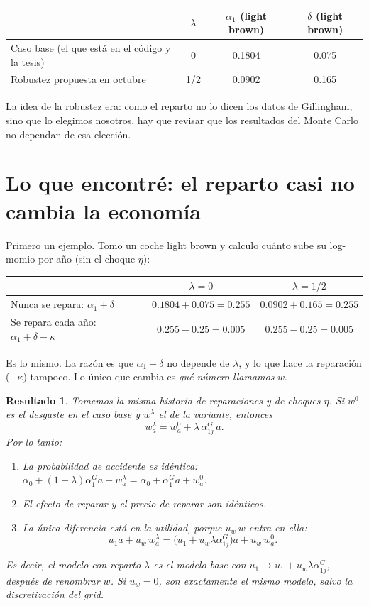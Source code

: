 \documentclass[11pt]{article}
\newtheorem*{resultado}{Resultado}
\begin{document}
\begin{center}
\begin{tabular}{lccc}
\toprule
 & $\lambda$ & $\alpha_1$ (light brown) & $\delta$ (light brown)\\
\midrule
Caso base (el que está en el código y la tesis) & 0 & 0.1804 & 0.075\\
Robustez propuesta en octubre & 1/2 & 0.0902 & 0.165\\
\bottomrule
\end{tabular}
\end{center}

La idea de la robustez era: como el reparto no lo dicen los datos de Gillingham, sino que lo
elegimos nosotros, hay que revisar que los resultados del Monte Carlo no dependan de esa
elección.

\section{Lo que encontré: el reparto casi no cambia la economía}

Primero un ejemplo. Tomo un coche light brown y calculo cuánto sube su log-momio por año
(sin el choque $\eta$):

\begin{center}
\begin{tabular}{lcc}
\toprule
 & $\lambda=0$ & $\lambda=1/2$\\
\midrule
Nunca se repara: $\alpha_1+\delta$ & $0.1804+0.075=0.255$ & $0.0902+0.165=0.255$\\
Se repara cada año: $\alpha_1+\delta-\kappa$ & $0.255-0.25=0.005$ & $0.255-0.25=0.005$\\
\bottomrule
\end{tabular}
\end{center}

Es lo mismo. La razón es que $\alpha_1+\delta$ no depende de $\lambda$, y lo que hace la
reparación ($-\kappa$) tampoco. Lo único que cambia es \emph{qué número llamamos} $w$.

\begin{resultado}
Tomemos la misma historia de reparaciones y de choques $\eta$. Si $w^0$ es el desgaste en el
caso base y $w^\lambda$ el de la variante, entonces
\[
w^\lambda_a=w^0_a+\lambda\,\alpha^G_{1j}\,a .
\]
Por lo tanto:
\begin{enumerate}
  \item La probabilidad de accidente es idéntica:
  $\alpha_0+(1-\lambda)\alpha^G_1a+w^\lambda_a=\alpha_0+\alpha^G_1a+w^0_a$.
  \item El efecto de reparar y el precio de reparar son idénticos.
  \item La única diferencia está en la utilidad, porque $u_w\,w$ entra en ella:
  \[
  u_1a+u_w\,w^\lambda_a=\big(u_1+u_w\lambda\alpha^G_{1j}\big)a+u_w\,w^0_a .
  \]
\end{enumerate}
Es decir, el modelo con reparto $\lambda$ es el modelo base con
$u_1\to u_1+u_w\lambda\alpha^G_{1j}$, después de renombrar $w$. Si $u_w=0$, son exactamente
el mismo modelo, salvo la discretización del grid.
\end{resultado}
\end{document}
